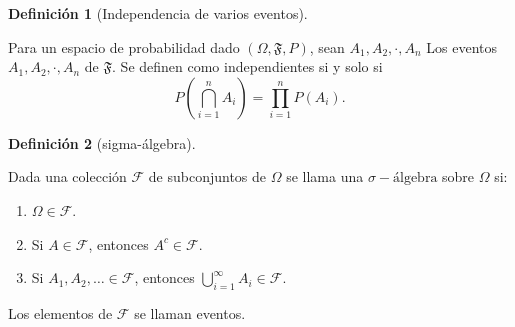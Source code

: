 \documentclass[
  us-letterpaper,
]{scrreprt}
\providecommand{\tightlist}{%
  \setlength{\itemsep}{0pt}\setlength{\parskip}{0pt}}\usepackage{longtable,booktabs,array}
\theoremstyle{plain}
\theoremstyle{definition}
\newtheorem{definition}{Definición}[chapter]
\theoremstyle{definition}
\theoremstyle{remark}
\begin{document}
\begin{definition}[Independencia de varios
eventos]\protect\hypertarget{def-indevarios}{}\label{def-indevarios}

Para un espacio de probabilidad dado \((\Omega, \mathfrak{F}, P)\), sean
\(A_1,A_2, \cdot , A_n\) Los eventos \(A_1,A_2, \cdot , A_n\) de
\(\mathfrak{F}\). Se definen como independientes si y solo si
\[P\left(\bigcap\limits_{i=1}^n A_i\right)=\prod\limits_{i=1}^n P(A_i).
 \]

\end{definition}

\begin{definition}[sigma-álgebra]\protect\hypertarget{def-sigmaa}{}\label{def-sigmaa}

Dada una colección \(\mathcal{F}\) de subconjuntos de \(\Omega\) se
llama una \(\sigma-\text{álgebra}\) sobre \(\Omega\) si:

\begin{enumerate}
\def\labelenumi{\roman{enumi})}
\tightlist
\item
  \(\Omega \in \mathcal{F}\).
\item
  Si \(A \in \mathcal{F}\), entonces \(A^c \in \mathcal{F}\).
\item
  Si \(A_1, A_2, \dots \in \mathcal{F}\), entonces
  \(\bigcup_{i=1}^{\infty} A_i \in \mathcal{F}\).
\end{enumerate}

\end{definition}

Los elementos de \(\mathcal{F}\) se llaman eventos.
\end{document}
